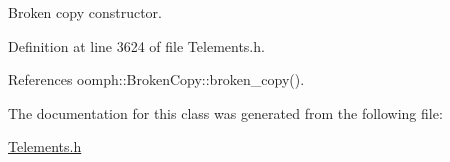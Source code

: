 Broken copy constructor. 



Definition at line 3624 of file Telements.\+h.



References oomph\+::\+Broken\+Copy\+::broken\+\_\+copy().



The documentation for this class was generated from the following file\+:\begin{DoxyCompactItemize}
\item 
\hyperlink{Telements_8h}{Telements.\+h}\end{DoxyCompactItemize}
